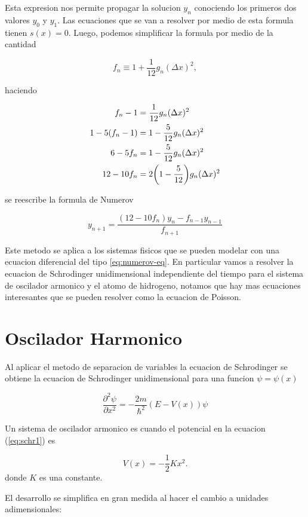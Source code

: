 \documentclass[11pt]{article}
\begin{document}
Esta expresion nos permite propagar la solucion \(y_n\) conociendo los primeros dos valores \(y_0\) y \(y_1\). Las ecuaciones que se van a resolver por medio de esta formula tienen \(s(x)=0\). Luego, podemos simplificar la formula por medio de la cantidad

\[ f_n \equiv 1 + \frac{1}{12}g_n(\Delta x)^2, \]

haciendo

\begin{align*}
    f_n - 1 &= \frac{1}{12}g_n(\Delta x)^2 \\
    1-5(f_n -1) &= 1-\frac{5}{12}g_n(\Delta x)^2 \\
    6-5f_n &= 1-\frac{5}{12}g_n(\Delta x)^2 \\
    12-10f_n &= 2\qty(1-\frac{5}{12})g_n(\Delta x)^2
\end{align*}

se reescribe la formula de Numerov

\begin{equation}
\label{eq:numerov}
    \boxed{y_{n+1} = \frac{(12-10f_n)y_n-f_{n-1}y_{n-1}}{f_{n+1}}}
\end{equation}




Este metodo se aplica a los sistemas fisicos que se pueden modelar con una ecuacion diferencial del tipo \ref{eq:numerov-eq}. En particular vamos a resolver la ecuacion de Schrodinger unidimensional independiente del tiempo para el sistema de oscilador armonico y el atomo de hidrogeno, notamos que hay mas ecuaciones interesantes que se pueden resolver como la ecuacion de Poisson.
\section{Oscilador Harmonico}
\label{sec:org26eee2f}

Al aplicar el metodo de separacion de variables la ecuacion de Schrodinger se obtiene la ecuacion de Schrodinger unidimensional para una funcion \(\psi = \psi(x)\)

\begin{equation}
\label{eq:schr1}
\frac{\partial^{2}\psi}{\partial x^2} = - \frac{2m}{\hbar^2}(E - V(x))\psi
\end{equation}

Un sistema de oscilador armonico es cuando el potencial en la ecuacion (\ref{eq:schr1}) es

\[ V(x) = - \frac{1}{2}K x^2. \]
donde \(K\) es una constante.

El desarrollo se simplifica en gran medida al hacer el cambio a unidades adimensionales:
\end{document}
